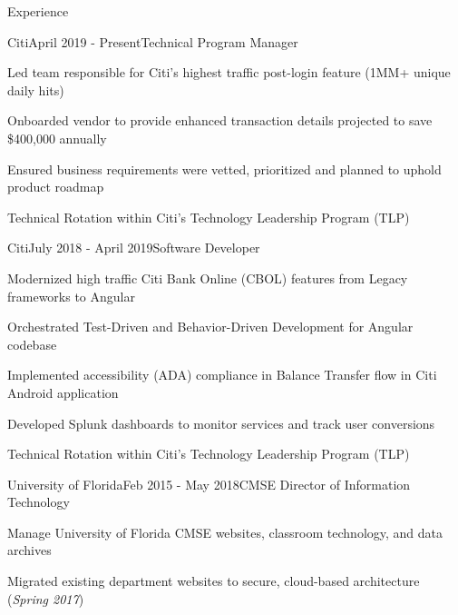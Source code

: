 \documentclass{resume} %
\begin{document}
\begin{rSection}{Experience}

\begin{rSubsection}{Citi}{April 2019 - Present}{Technical Program Manager}{}
\setlength{\itemindent}{.25in}
\item Led team responsible for Citi's highest traffic post-login feature (1MM+ unique daily hits)
\item Onboarded vendor to provide enhanced transaction details projected to save \$400,000 annually
\item Ensured business requirements were vetted, prioritized and planned to uphold product roadmap
\item Technical Rotation within Citi's Technology Leadership Program (TLP)
\end{rSubsection}

\begin{rSubsection}{Citi}{July 2018 - April 2019}{Software Developer}{}
\setlength{\itemindent}{.25in}
\item Modernized high traffic Citi Bank Online (CBOL) features from Legacy frameworks to Angular
\item Orchestrated Test-Driven and Behavior-Driven Development for Angular codebase
\item Implemented accessibility (ADA) compliance in Balance Transfer flow in Citi Android application
\item Developed Splunk dashboards to monitor services and track user conversions
\item Technical Rotation within Citi's Technology Leadership Program (TLP)
\end{rSubsection}

\begin{rSubsection}{University of Florida}{Feb 2015 - May 2018}{CMSE Director of Information Technology}{}
\setlength{\itemindent}{.25in}
\item Manage University of Florida CMSE websites, classroom technology, and data archives
\item Migrated existing department websites to secure, cloud-based architecture (\textit{Spring 2017})
\end{rSubsection}



\end{rSection}
\end{document}
